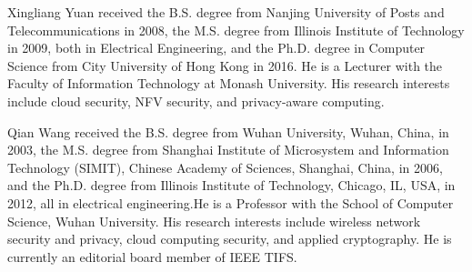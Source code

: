 \vspace{-3.5em}
\begin{IEEEbiography}{Xingliang Yuan} received the B.S. degree from Nanjing University of Posts and Telecommunications in 2008, the M.S. degree from Illinois Institute of Technology in 2009, both in Electrical Engineering, and the Ph.D. degree in Computer Science from City University of Hong Kong in 2016. He is a Lecturer with the Faculty of Information Technology at Monash University. His research interests include cloud security, NFV security, and privacy-aware computing.
\end{IEEEbiography}

\vspace{-3.5em}

\begin{IEEEbiography}{Qian Wang} received the B.S. degree from Wuhan University, Wuhan, China, in 2003, the M.S. degree from Shanghai Institute of Microsystem and Information Technology (SIMIT), Chinese Academy of Sciences, Shanghai, China, in 2006, and the Ph.D. degree from Illinois Institute of Technology, Chicago, IL, USA, in 2012, all in electrical engineering.He is a Professor with the School of Computer Science, Wuhan University. His research interests include wireless network security and privacy, cloud computing security, and applied cryptography. He is currently an editorial board member of IEEE TIFS.
\end{IEEEbiography}

\vspace{-3.5em}


